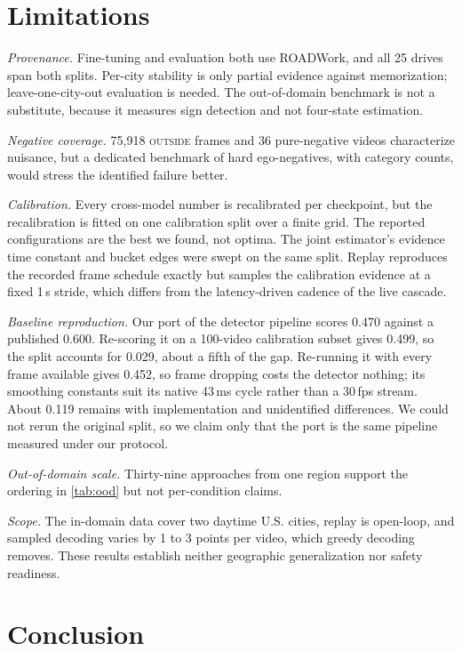 \documentclass[journal]{IEEEtran}
\newcommand{\st}[1]{\textsc{#1}}
\begin{document}
\section{Limitations}
\label{sec:limitations}

\emph{Provenance.}  Fine-tuning and evaluation both use ROADWork, and all 25 drives span both splits.  Per-city stability is only partial evidence against memorization; leave-one-city-out evaluation is needed.  The out-of-domain benchmark is not a substitute, because it measures sign detection and not four-state estimation.

\emph{Negative coverage.}  75{,}918 \st{outside} frames and 36 pure-negative videos characterize nuisance, but a dedicated benchmark of hard ego-negatives, with category counts, would stress the identified failure better.

\emph{Calibration.}  Every cross-model number is recalibrated per checkpoint, but the recalibration is fitted on one calibration split over a finite grid.  The reported configurations are the best we found, not optima.  The joint estimator's evidence time constant and bucket edges were swept on the same split.  Replay reproduces the recorded frame schedule exactly but samples the calibration evidence at a fixed 1\,s stride, which differs from the latency-driven cadence of the live cascade.

\emph{Baseline reproduction.}  Our port of the detector pipeline scores 0.470 against a published 0.600.  Re-scoring it on a 100-video calibration subset gives 0.499, so the split accounts for 0.029, about a fifth of the gap. Re-running it with every frame available gives 0.452, so frame dropping costs the detector nothing; its smoothing constants suit its native 43\,ms cycle rather than a 30\,fps stream.  About 0.119 remains with implementation and unidentified differences.  We could not rerun the original split, so we claim only that the port is the same pipeline measured under our protocol.

\emph{Out-of-domain scale.}  Thirty-nine approaches from one region support the ordering in \cref{tab:ood} but not per-condition claims.

\emph{Scope.}  The in-domain data cover two daytime U.S. cities, replay is open-loop, and sampled decoding varies by 1 to 3 points per video, which greedy decoding removes.  These results establish neither geographic generalization nor safety readiness.

\section{Conclusion}
\label{sec:conclusion}
\end{document}
